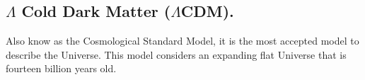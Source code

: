 \documentclass[onecolumn,           %
               showpacs,            %
               preprintnumbers,     %
               aps,                 %
               letterpaper,             %
               superscriptaddress,      %
               nofootinbib,         %
               tightenlines,        %
               floats,floatfix      %
               ,usenatbib,
               ]{revtex4-1}
\begin{document}
%
%

\subsection{$\Lambda$ Cold Dark Matter ($\Lambda$CDM).}
Also know as the Cosmological Standard Model, it is the most accepted model to describe the Universe. This model considers an expanding flat Universe that is fourteen billion years old. 
\end{document}
